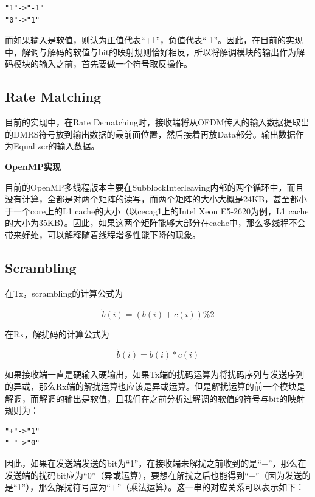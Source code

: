 \documentclass[titlepage]{article}
\numberwithin{figure}{section}
\numberwithin{equation}{section}
\begin{document}
\begin{verbatim}
"1"->"-1"
"0"->"1"
\end{verbatim}

而如果输入是软值，则认为正值代表“+1”，负值代表“-1”。因此，在目前的实现中，解调与解码的软值与bit的映射规则恰好相反，所以将解调模块的输出作为解码模块的输入之前，首先要做一个符号取反操作。

\subsection{Rate Matching}

目前的实现中，在Rate Dematching时，接收端将从OFDM传入的输入数据提取出的DMRS符号放到输出数据的最前面位置，然后接着再放Data部分。输出数据作为Equalizer的输入数据。

\textbf{OpenMP实现}

目前的OpenMP多线程版本主要在SubblockInterleaving内部的两个循环中，而且没有计算，全都是对两个矩阵的读写，而两个矩阵的大小大概是24KB，甚至都小于一个core上的L1 cache的大小（以cecag1上的Intel Xeon E5-2620为例，L1 cache的大小为35KB）。因此，如果这两个矩阵能够大部分在cache中，那么多线程不会带来好处，可以解释随着线程增多性能下降的现象。

\subsection{Scrambling}

在Tx，scrambling的计算公式为

\begin{displaymath}
  {\tilde b(i)}=(b(i)+c(i))\%2
\end{displaymath}

在Rx，解扰码的计算公式为

\begin{displaymath}
  {\tilde b(i)}=b(i)*c(i)
\end{displaymath}

如果接收端一直是硬输入硬输出，如果Tx端的扰码运算为将扰码序列与发送序列的异或，那么Rx端的解扰运算也应该是异或运算。但是解扰运算的前一个模块是解调，而解调的输出是软值，且我们在之前分析过解调的软值的符号与bit的映射规则为：

\begin{verbatim}
"+"->"1"
"-"->"0"
\end{verbatim}

因此，如果在发送端发送的bit为“1”，在接收端未解扰之前收到的是“+”，那么在发送端的扰码bit应为“0”（异或运算），要想在解扰之后也能得到“+”（因为发送的是“1”），那么解扰符号应为“+”（乘法运算）。这一串的对应关系可以表示如下：
\end{document}
